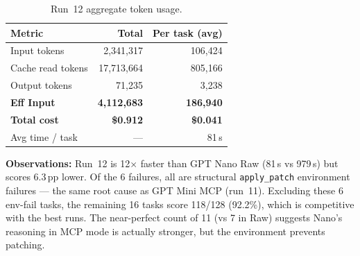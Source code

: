 \begin{table}[h]
\centering
\caption{Run~12 aggregate token usage.}\label{tab:r12-tokens}
\begin{tabular}{lrr}
\toprule
\textbf{Metric} & \textbf{Total} & \textbf{Per task (avg)} \\
\midrule
Input tokens         & 2,341,317  & 106,424 \\
Cache read tokens    & 17,713,664 & 805,166 \\
Output tokens        & 71,235     & 3,238   \\
\midrule
\textbf{Eff Input}   & \textbf{4,112,683} & \textbf{186,940} \\
\textbf{Total cost}  & \textbf{\$0.912}   & \textbf{\$0.041} \\
Avg time / task      & ---         & 81\,s \\
\bottomrule
\end{tabular}
\end{table}

\noindent
\textbf{Observations:} Run~12 is 12$\times$ faster than GPT Nano Raw (81\,s vs 979\,s)
but scores 6.3\,pp lower.
Of the 6 failures, all are structural \texttt{apply\_patch} environment failures ---
the same root cause as GPT Mini MCP (run~11).
Excluding these 6 env-fail tasks, the remaining 16 tasks score 118/128 (92.2\%),
which is competitive with the best runs.
The near-perfect count of 11 (vs 7 in Raw) suggests Nano's reasoning in MCP mode
is actually stronger, but the environment prevents patching.
